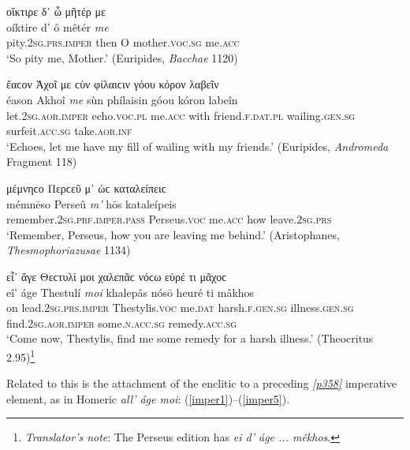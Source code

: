 \begin{exe}
\ex οἴκτιρε δ᾽ ὦ μῆτέρ με\\
\gll oíktire d' ô mêtér \emph{me}\\
pity.\textsc{2sg.prs.imper} then O mother.\textsc{voc.sg} me.\textsc{acc}\\
\trans `So pity me, Mother.' (Euripides, \textit{Bacchae} 1120)
\label{voc6}
\end{exe}

\begin{exe}
\ex ἔαϲον Ἀχοῖ με ϲὺν φίλαιϲιν γόου κόρον λαβεῖν\\
\gll éason Akhoî \emph{me} sùn phílaisin góou kóron labeîn\\
let.\textsc{2sg.aor.imper} echo.\textsc{voc.pl} me.\textsc{acc} with
friend.\textsc{f.dat.pl} wailing.\textsc{gen.sg} surfeit.\textsc{acc.sg} take.\textsc{aor.inf}\\
\trans `Echoes, let me have my fill of wailing with my friends.' (Euripides, \textit{Andromeda} Fragment 118)
\label{voc7}
\end{exe}

\begin{exe}
\ex μέμνηϲο Περϲεῦ μ᾽ ὡϲ καταλείπειϲ\\
\gll mémnēso Perseû \emph{m'} hōs kataleípeis\\
remember.\textsc{2sg.prf.imper.pass} Perseus\textsc{.voc} me.\textsc{acc} how leave.\textsc{2sg.prs}\\
\trans `Remember, Perseus, how you are leaving me behind.' (Aristophanes, \textit{Thesmophoriazusae} 1134)
\label{voc8}
\end{exe}

\begin{exe}
\ex εἶ᾽ ἄγε Θεϲτυλί μοι χαλεπᾶϲ νόϲω εὑρέ τι μᾶχοϲ\\
\gll eî' áge Thestulí \emph{moi} khalepâs nósō heuré ti mâkhos\\
on lead.\textsc{2sg.prs.imper} Thestylis.\textsc{voc} me.\textsc{dat} harsh.\textsc{f.gen.sg} illness.\textsc{gen.sg} find.\textsc{2sg.aor.imper} some.\textsc{n.acc.sg} remedy.\textsc{acc.sg}\\
\trans `Come now, Thestylis, find me some remedy for a harsh illness.' (Theocritus 2.95)\footnote{\emph{Translator's note}: The Perseus edition has \textit{ei d' áge ... mêkhos}.}
\label{voc9}
\end{exe}

Related to this is the attachment of the enclitic to a preceding \hyperlink{p358}{\emph{[p358]}} imperative element, as in Homeric \textit{all' áge moi}: (\ref{imper1})--(\ref{imper5}).

